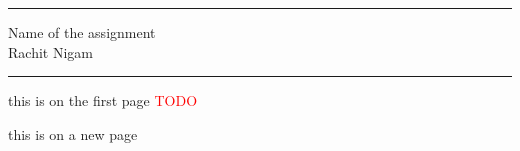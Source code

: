 \documentclass{article}
\newcommand{\todo}{\textcolor{red}{TODO}}
\newcommand{\name}{Rachit Nigam}
\newcommand{\assignment}{Name of the assignment}
\newcommand{\makespace}{\vspace{10pt}}
\begin{document}
\begin{center}
  \hrule
  \makespace{}
  \huge{\assignment} \\
  \makespace{}
  \large{\name}
  \makespace{}
  \hrule
  \makespace{}
\end{center}
\thispagestyle{empty}

this is on the first page
\todo

\newpage
this is on a new page
\end{document}
